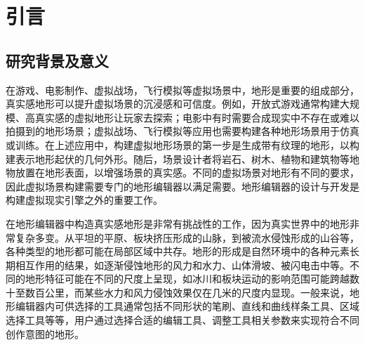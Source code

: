 
\chapter{引言}
\section{研究背景及意义}
在游戏、电影制作、虚拟战场，飞行模拟等虚拟场景中，地形是重要的组成部分，真实感地形可以提升虚拟场景的沉浸感和可信度。例如，开放式游戏通常构建大规模、高真实感的虚拟地形让玩家去探索；电影中有时需要合成现实中不存在或难以拍摄到的地形场景；虚拟战场、飞行模拟等应用也需要构建各种地形场景用于仿真或训练。在上述应用中，构建虚拟地形场景的第一步是生成带有纹理的地形，以构建表示地形起伏的几何外形。随后，场景设计者将岩石、树木、植物和建筑物等地物放置在地形表面，以增强场景的真实感。不同的虚拟场景对地形有不同的要求，因此虚拟场景构建需要专门的地形编辑器以满足需要。地形编辑器的设计与开发是构建虚拟现实引擎之外的重要工作。\par
在地形编辑器中构造真实感地形是非常有挑战性的工作，因为真实世界中的地形非常复杂多变。从平坦的平原、板块挤压形成的山脉，到被流水侵蚀形成的山谷等，各种类型的地形都可能在局部区域中共存。地形的形成是自然环境中的各种元素长期相互作用的结果，如逐渐侵蚀地形的风力和水力、山体滑坡、被闪电击中等。不同的地形特征可能在不同的尺度上呈现，如冰川和板块运动的影响范围可能跨越数十至数百公里，而某些水力和风力侵蚀效果仅在几米的尺度内显现。一般来说，地形编辑器内可供选择的工具通常包括不同形状的笔刷、直线和曲线样条工具、区域选择工具等等，用户通过选择合适的编辑工具、调整工具相关参数来实现符合不同创作意图的地形。\par

